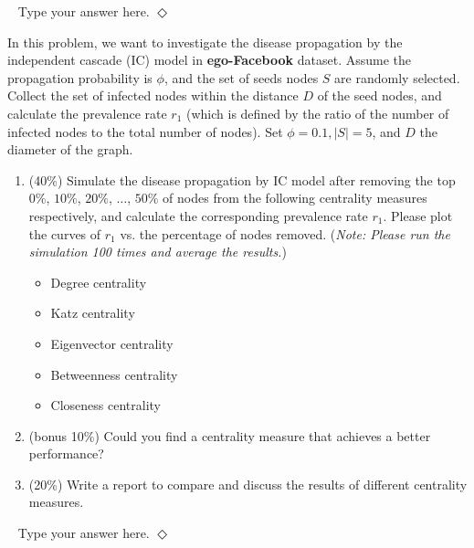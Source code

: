 \documentclass[12pt]{article}
\newcommand {\bsolution}{\noindent {\em Solution:} \ }
\newcommand{\esolution}{\hfill $\Diamond$ \\ \vspace{.3cm}}
\begin{document}
\bsolution
Type your answer here.
\esolution



 In this problem, we want to investigate the disease propagation by the independent cascade (IC) model in {\bf ego-Facebook} \cite{leskovec2012learning} dataset. Assume the propagation probability is $\phi$, and the set of seeds nodes $S$ are randomly selected. Collect the set of infected nodes within the distance $D$ of the seed nodes, and calculate the prevalence rate $r_1$ (which is defined by the ratio of the number of infected nodes to the total number of nodes). Set $\phi=0.1, \vert S \vert=5$, and $D$ the diameter of the graph.

\begin{enumerate}[label=(\alph*)]
	\item (40\%) Simulate the disease propagation by IC model after removing the top $0\%$, $10\%$, $20\%$, $\ldots$, $50\%$ of nodes from the following centrality measures respectively, and calculate the corresponding prevalence rate $r_1$. Please plot the curves of $r_1$ vs. the percentage of nodes removed. ({\it Note: Please run the simulation 100 times and average the results.})
	\begin{itemize}
		\item Degree centrality
		\item Katz centrality
		\item Eigenvector centrality
		\item Betweenness centrality
		\item Closeness centrality
	\end{itemize}
	\item (bonus 10\%) Could you find a centrality measure that achieves a better performance?
	\item (20\%) Write a report to compare and discuss the results of different centrality measures.  
\end{enumerate}

\bsolution
Type your answer here.
\esolution
\end{document}
